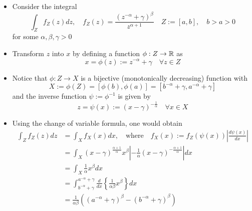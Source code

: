 \documentclass[12pt,a4paper]{article}
\begin{document}
\begin{itemize}
  \begin{itemize}
  \item Consider the integral
    \begin{equation}\nonumber%
      \int_{Z} f_{Z}(z)dz,
      \quad
      f_{Z}(z) = \frac{(z^{-\alpha}+\gamma)^{\beta}}{z^{\alpha+1}}
      \quad Z:=[a, b],
      \quad b>a>0
    \end{equation}
    for some $\alpha, \beta,\gamma>0$
  \item Transform $z$ into $x$ by defining a function $\phi:Z\to \mathbb{R}$ as
    \begin{equation}\nonumber%
      x = \phi(z) := z^{-\alpha} + \gamma
      \quad \forall z \in Z
    \end{equation}
  \item Notice that $\phi:Z\to X$ is a bijective (monotonically decreasing) function with
    \begin{equation}\nonumber%
      X:=
      \phi(Z) =
      [\phi(b), \phi(a)]
      =
      [b^{-\alpha} + \gamma, a^{-\alpha} + \gamma]
    \end{equation}
    and the inverse function $\psi:=\phi^{-1}$ is given by
    \begin{equation}\nonumber%
      z = \psi(x):=(x - \gamma)^{- \frac{1}{\alpha}}
      \quad \forall x \in X
    \end{equation}
  \item Using the change of variable formula, one would obtain
    \begin{align}
      \int_{Z}f_{Z}(z)dz
        & = \int_{X}f_{X}(x)dx,\quad\text{where}\quad f_{X}(x):=f_{Z}(\psi(x))\left| \frac{d\psi(x)}{dx}\right|  \nonumber \\
        & = \int_{X} (x-\gamma)^{\frac{\alpha+1}{\alpha}}x^{\beta}\left|-\frac{1}{\alpha}(x-\gamma)^{- \frac{\alpha+1}{\alpha}}\right|dx  \nonumber \\
        & = \int_{X} \frac{1}{\alpha} x^{\beta}dx  \nonumber \\
        & = \int_{b^{-\alpha} + \gamma}^{a^{-\alpha} + \gamma} \frac{d}{dx}\left\{\frac{1}{\alpha \beta} x^{\beta} \right\}dx  \nonumber \\
        & = \frac{1}{\alpha \beta} \left((a^{-\alpha} + \gamma)^{\beta} - (b^{-\alpha} + \gamma)^{\beta} \right)
    \nonumber%
    \end{align}

  \end{itemize}


\end{itemize}
\end{document}

